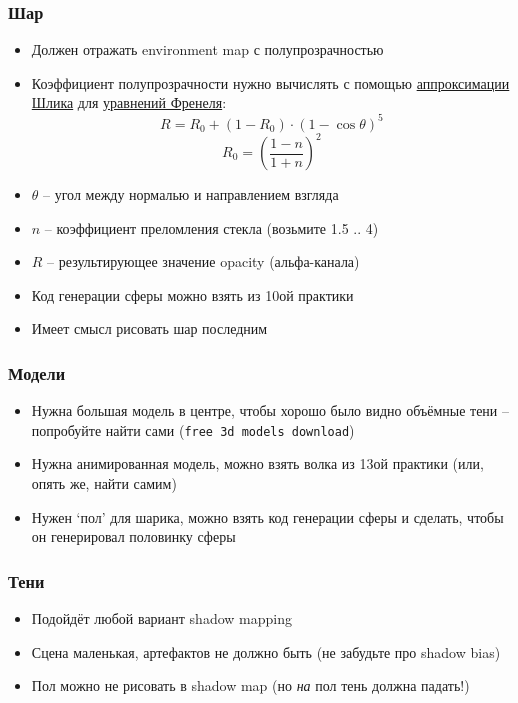 \documentclass{beamer}
\begin{document}
\begin{frame}[fragile]
\frametitle{Шар}
\begin{itemize}
\item Должен отражать environment map с полупрозрачностью
\item Коэффициент полупрозрачности нужно вычислять с помощью \href{https://en.wikipedia.org/wiki/Schlick%27s_approximation}{аппроксимации Шлика} для \href{https://en.wikipedia.org/wiki/Fresnel_equations}{уравнений Френеля}:
\begin{equation}
R = R_0 + (1 - R_0) \cdot (1 - \cos \theta)^5
\end{equation}
\begin{equation}
R_0 = \left(\frac{1-n}{1+n}\right)^2
\end{equation}
\item \begin{math}\theta\end{math} -- угол между нормалью и направлением взгляда
\item \begin{math}n\end{math} -- коэффициент преломления стекла (возьмите 1.5 .. 4)
\item \begin{math}R\end{math} -- результирующее значение opacity (альфа-канала)
\item Код генерации сферы можно взять из 10ой практики
\item Имеет смысл рисовать шар последним
\end{itemize}
\end{frame}

\begin{frame}[fragile]
\frametitle{Модели}
\begin{itemize}
\item Нужна большая модель в центре, чтобы хорошо было видно объёмные тени -- попробуйте найти сами (\verb|free 3d models download|)
\item Нужна анимированная модель, можно взять волка из 13ой практики (или, опять же, найти самим)
\item Нужен `пол' для шарика, можно взять код генерации сферы и сделать, чтобы он генерировал половинку сферы
\end{itemize}
\end{frame}

\begin{frame}[fragile]
\frametitle{Тени}
\begin{itemize}
\item Подойдёт любой вариант shadow mapping
\item Сцена маленькая, артефактов не должно быть (не забудьте про shadow bias)
\item Пол можно не рисовать в shadow map (но \textit{на} пол тень должна падать!)
\end{itemize}
\end{frame}
\end{document}
